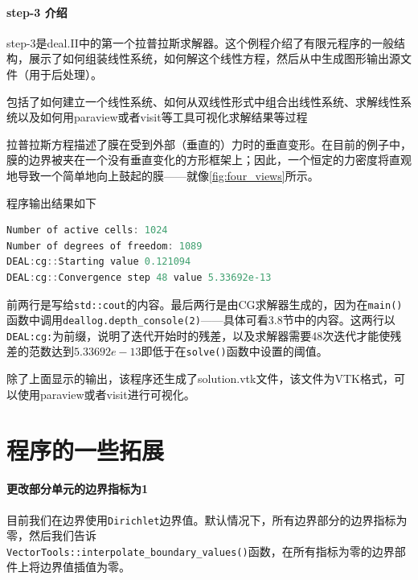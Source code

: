 \documentclass[12pt, a4paper]{article}
\numberwithin{equation}{section} %
\begin{document}
\paragraph{step-3 介绍}
step-3是deal.II中的第一个拉普拉斯求解器。这个例程介绍了有限元程序的一般结构，展示了如何组装线性系统，如何解这个线性方程，然后从中生成图形输出源文件（用于后处理）。

包括了如何建立一个线性系统、如何从双线性形式中组合出线性系统、求解线性系统以及如何用paraview或者visit等工具可视化求解结果等过程

拉普拉斯方程描述了膜在受到外部（垂直的）力时的垂直变形。在目前的例子中，膜的边界被夹在一个没有垂直变化的方形框架上；因此，一个恒定的力密度将直观地导致一个简单地向上鼓起的膜——就像\ref{fig:four_views}所示。

程序输出结果如下
\begin{lstlisting}[language=c]
Number of active cells: 1024
Number of degrees of freedom: 1089
DEAL:cg::Starting value 0.121094
DEAL:cg::Convergence step 48 value 5.33692e-13
\end{lstlisting}
前两行是写给\verb|std::cout|的内容。最后两行是由CG求解器生成的，因为在\verb|main()|函数中调用\verb|deallog.depth_console(2)|——具体可看3.8节中的内容。这两行以\verb|DEAL:cg:|为前缀，说明了迭代开始时的残差，以及求解器需要48次迭代才能使残差的范数达到$5.33692e-13$即低于在\verb|solve()|函数中设置的阈值。

除了上面显示的输出，该程序还生成了solution.vtk文件，该文件为VTK格式，可以使用paraview或者visit进行可视化。


\newpage
\section{程序的一些拓展}
\paragraph{更改部分单元的边界指标为1}

目前我们在边界使用\verb|Dirichlet|边界值。默认情况下，所有边界部分的边界指标为零，然后我们告诉\\
\verb|VectorTools::interpolate_boundary_values()|函数，在所有指标为零的边界部件上将边界值插值为零。
\end{document}
